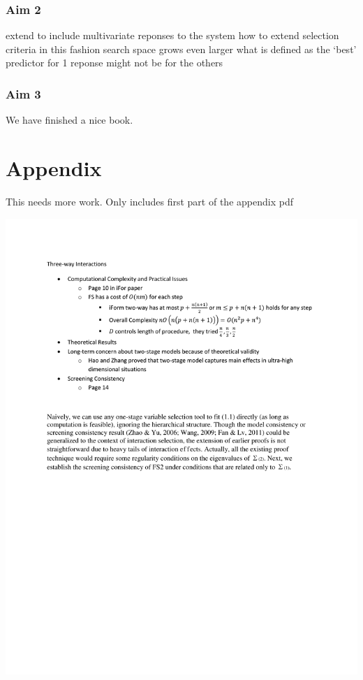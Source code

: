 \documentclass[11pt,]{book}
\theoremstyle{definition}
\theoremstyle{definition}
\theoremstyle{remark}
\begin{document}
\subsection{Aim 2}\label{aim-2}

extend to include multivariate reponses to the system how to extend
selection criteria in this fashion search space grows even larger what
is defined as the `best' predictor for 1 reponse might not be for the
others

\subsection{Aim 3}\label{aim-3}

We have finished a nice book.

\chapter{Appendix}\label{appendix}

This needs more work. Only includes first part of the appendix pdf

\begin{center} 
\includegraphics[width=8in]{appendix.pdf} 
\end{center}


\end{document}
